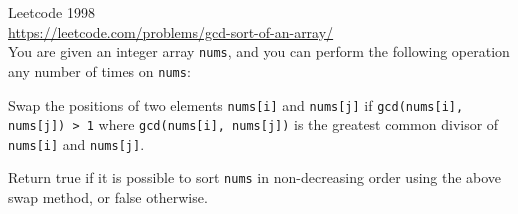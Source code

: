   Leetcode 1998
  \\
  \url{https://leetcode.com/problems/gcd-sort-of-an-array/}
  \\
  You are given an integer array \verb!nums!,
  and you can perform the following operation any number of times on
  \verb!nums!:
  \begin{enumerate}[nosep]
    \li Swap the positions of two elements \verb!nums[i]! and \verb!nums[j]! if
    \texttt{gcd(nums[i], nums[j]) > 1} where
    \texttt{gcd(nums[i], nums[j])} is the
    greatest common divisor of \verb!nums[i]! and \verb!nums[j]!.
  \end{enumerate}
  Return true if it is possible to sort \verb!nums! in non-decreasing order
  using the above swap method, or false otherwise.
